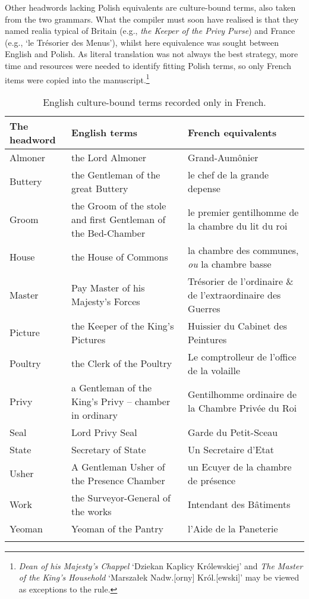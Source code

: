 \documentclass[output=paper,colorlinks,citecolor=brown,arabicfont,chinesefont]{langscibook}
\begin{document}
Other headwords lacking Polish equivalents are culture-bound terms, also taken from the two grammars. What the compiler must soon have realised is that they named realia typical of Britain (e.g., \emph{the Keeper of the Privy Purse}) and France (e.g., ‘le Trésorier des Menus’), whilst here equivalence was sought between English and Polish. As literal translation was not always the best strategy, more time and resources were needed to identify fitting Polish terms, so only French items were copied into the manuscript.\footnote{\emph{Dean of his Majesty’s Chappel} ‘Dziekan Kaplicy Królewskiej’ and \emph{The Master of the King’s Household} ‘Marszałek Nadw.[orny] Król.[ewski]’ may be viewed as exceptions to the rule.}

\begin{table}
\caption {English culture-bound terms recorded only in French.}
\label{tab:podhajecka:4}
\begin{tabularx}{\linewidth}{ lQQ }
\lsptoprule
The headword & English terms & French equivalents \\\midrule
Almoner & the Lord Almoner & Grand-Aumônier \\
Buttery & the Gentleman of the great Buttery & le chef de la grande depense \\
Groom & the Groom of the stole and first Gentleman of the Bed-Chamber & le premier gentilhomme de la chambre du lit du roi \\
House & the House of Commons & la chambre des communes, \emph{ou} la chambre basse \\
Master & Pay Master of his Majesty’s Forces & Trésorier de l'ordinaire \& de l'extraordinaire des Guerres \\
Picture & the Keeper of the King’s Pictures & Huissier du Cabinet des Peintures \\
Poultry & the Clerk of the Poultry & Le comptrolleur de l'office de la volaille \\
Privy & a Gentleman of the King’s Privy – chamber in ordinary & Gentilhomme ordinaire de la Chambre Privée du Roi \\
Seal & Lord Privy Seal & Garde du Petit-Sceau \\
State & Secretary of State & Un Secretaire d'Etat \\
Usher & A Gentleman Usher of the Presence Chamber & un Ecuyer de la chambre de présence \\
Work & the Surveyor-General of the works & Intendant des Bâtiments \\
Yeoman & Yeoman of the Pantry & l'Aide de la Paneterie \\
\lspbottomrule
\end{tabularx}
\end{table}
\end{document}
